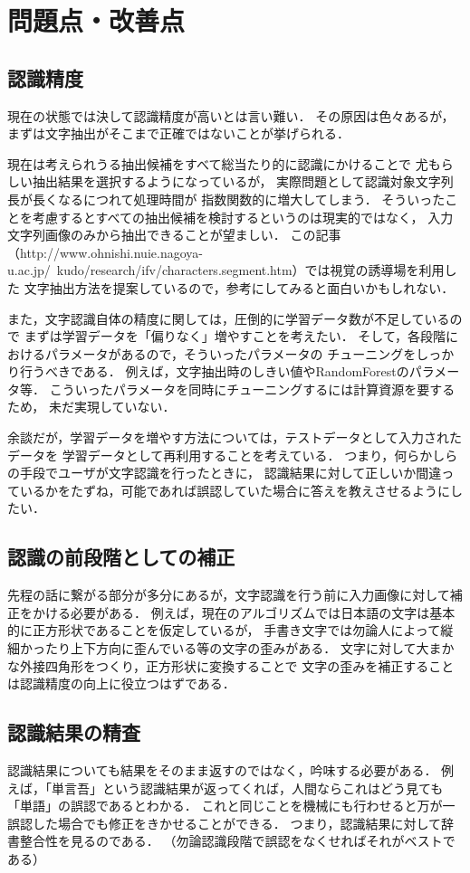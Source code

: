 \documentclass[11pt, a4paper]{jsarticle}
\begin{document}
\section{問題点・改善点}
\subsection{認識精度}
現在の状態では決して認識精度が高いとは言い難い．
その原因は色々あるが，まずは文字抽出がそこまで正確ではないことが挙げられる．

現在は考えられうる抽出候補をすべて総当たり的に認識にかけることで
尤もらしい抽出結果を選択するようになっているが，
実際問題として認識対象文字列長が長くなるにつれて処理時間が
指数関数的に増大してしまう．
そういったことを考慮するとすべての抽出候補を検討するというのは現実的ではなく，
入力文字列画像のみから抽出できることが望ましい．
この記事（http://www.ohnishi.nuie.nagoya-u.ac.jp/~kudo/research/ifv/characters.segment.htm）では視覚の誘導場を利用した
文字抽出方法を提案しているので，参考にしてみると面白いかもしれない．

また，文字認識自体の精度に関しては，圧倒的に学習データ数が不足しているので
まずは学習データを「偏りなく」増やすことを考えたい．
そして，各段階におけるパラメータがあるので，そういったパラメータの
チューニングをしっかり行うべきである．
例えば，文字抽出時のしきい値やRandomForestのパラメータ等．
こういったパラメータを同時にチューニングするには計算資源を要するため，
未だ実現していない．

余談だが，学習データを増やす方法については，テストデータとして入力されたデータを
学習データとして再利用することを考えている．
つまり，何らかしらの手段でユーザが文字認識を行ったときに，
認識結果に対して正しいか間違っているかをたずね，可能であれば誤認していた場合に答えを教えさせるようにしたい．

\subsection{認識の前段階としての補正}
先程の話に繋がる部分が多分にあるが，文字認識を行う前に入力画像に対して補正をかける必要がある．
例えば，現在のアルゴリズムでは日本語の文字は基本的に正方形状であることを仮定しているが，
手書き文字では勿論人によって縦細かったり上下方向に歪んでいる等の文字の歪みがある．
文字に対して大まかな外接四角形をつくり，正方形状に変換することで
文字の歪みを補正することは認識精度の向上に役立つはずである．

\subsection{認識結果の精査}
認識結果についても結果をそのまま返すのではなく，吟味する必要がある．
例えば，「単言吾」という認識結果が返ってくれば，人間ならこれはどう見ても「単語」の誤認であるとわかる．
これと同じことを機械にも行わせると万が一誤認した場合でも修正をきかせることができる．
つまり，認識結果に対して辞書整合性を見るのである．
（勿論認識段階で誤認をなくせればそれがベストである）
\end{document}
